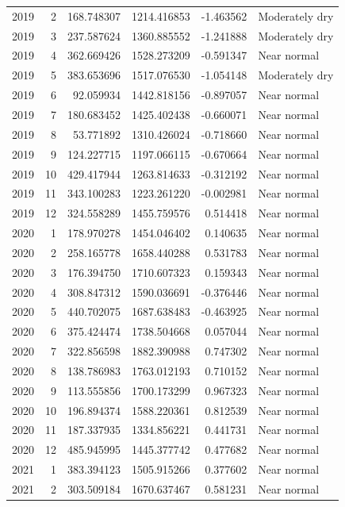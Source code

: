 \begin{tabular}{rrrrrl}
2019 & 2 & 168.748307 & 1214.416853 & -1.463562 & Moderately dry \\
2019 & 3 & 237.587624 & 1360.885552 & -1.241888 & Moderately dry \\
2019 & 4 & 362.669426 & 1528.273209 & -0.591347 & Near normal \\
2019 & 5 & 383.653696 & 1517.076530 & -1.054148 & Moderately dry \\
2019 & 6 & 92.059934 & 1442.818156 & -0.897057 & Near normal \\
2019 & 7 & 180.683452 & 1425.402438 & -0.660071 & Near normal \\
2019 & 8 & 53.771892 & 1310.426024 & -0.718660 & Near normal \\
2019 & 9 & 124.227715 & 1197.066115 & -0.670664 & Near normal \\
2019 & 10 & 429.417944 & 1263.814633 & -0.312192 & Near normal \\
2019 & 11 & 343.100283 & 1223.261220 & -0.002981 & Near normal \\
2019 & 12 & 324.558289 & 1455.759576 & 0.514418 & Near normal \\
2020 & 1 & 178.970278 & 1454.046402 & 0.140635 & Near normal \\
2020 & 2 & 258.165778 & 1658.440288 & 0.531783 & Near normal \\
2020 & 3 & 176.394750 & 1710.607323 & 0.159343 & Near normal \\
2020 & 4 & 308.847312 & 1590.036691 & -0.376446 & Near normal \\
2020 & 5 & 440.702075 & 1687.638483 & -0.463925 & Near normal \\
2020 & 6 & 375.424474 & 1738.504668 & 0.057044 & Near normal \\
2020 & 7 & 322.856598 & 1882.390988 & 0.747302 & Near normal \\
2020 & 8 & 138.786983 & 1763.012193 & 0.710152 & Near normal \\
2020 & 9 & 113.555856 & 1700.173299 & 0.967323 & Near normal \\
2020 & 10 & 196.894374 & 1588.220361 & 0.812539 & Near normal \\
2020 & 11 & 187.337935 & 1334.856221 & 0.441731 & Near normal \\
2020 & 12 & 485.945995 & 1445.377742 & 0.477682 & Near normal \\
2021 & 1 & 383.394123 & 1505.915266 & 0.377602 & Near normal \\
2021 & 2 & 303.509184 & 1670.637467 & 0.581231 & Near normal \\

\end{tabular}

